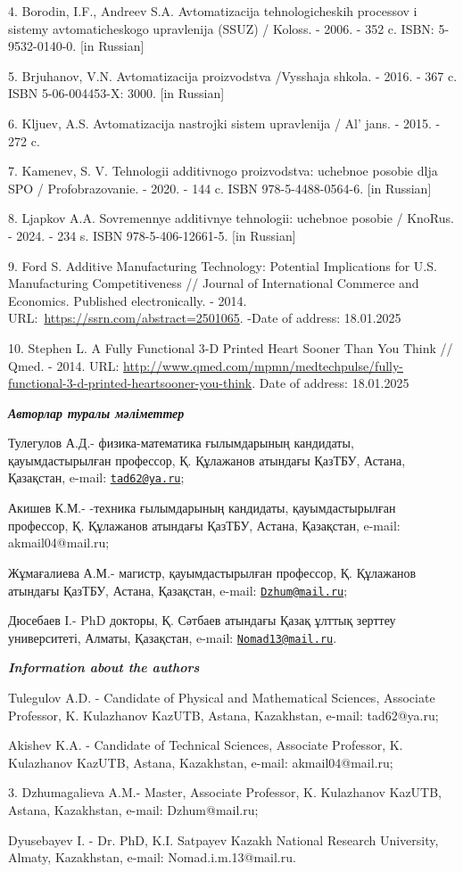 4. Borodin, I.F., Andreev S.A. Avtomatizacija tehnologicheskih processov
i sistemy avtomaticheskogo upravlenija (SSUZ) / Koloss. - 2006. - 352 c.
ISBN: 5-9532-0140-0. {[}in Russian{]}

5. Brjuhanov, V.N. Avtomatizacija proizvodstva /Vysshaja shkola. - 2016.
- 367 c. ISBN 5-06-004453-X: 3000. {[}in Russian{]}

6. Kljuev, A.S. Avtomatizacija nastrojki sistem upravlenija /
Al' jans. - 2015. - 272 c.

7. Kamenev, S. V. Tehnologii additivnogo proizvodstva: uchebnoe posobie
dlja SPO / Profobrazovanie. - 2020. - 144 c. ISBN 978-5-4488-0564-6.
{[}in Russian{]}

8. Ljapkov A.A. Sovremennye additivnye tehnologii: uchebnoe posobie /
KnoRus. - 2024. - 234 s. ISBN 978-5-406-12661-5. {[}in Russian{]}

9. Ford S. Additive Manufacturing Technology: Potential Implications for
U.S. Manufacturing Competitiveness // Journal of International Commerce
and Economics. Published electronically. - 2014.
URL:~\url{https://ssrn.com/abstract=2501065}. -Date of address:
18.01.2025

10. Stephen L. A Fully Functional 3-D Printed Heart Sooner Than You
Think // Qmed. - 2014. URL:
\url{http://www.qmed.com/mpmn/medtechpulse/fully-functional-3-d-printed-heartsooner-you-think}.
Date of address: 18.01.2025

\emph{{\bfseries Авторлар туралы мәліметтер}}

Тулегулов А.Д.- физика-математика ғылымдарының кандидаты,
қауымдастырылған профессор, Қ. Құлажанов атындағы ҚазТБУ, Астана,
Қазақстан, e-mail: \href{mailto:tad62@ya.ru}{\nolinkurl{tad62@ya.ru}};

Акишев К.М.- -техника ғылымдарының кандидаты, қауымдастырылған
профессор, Қ. Құлажанов атындағы ҚазТБУ, Астана, Қазақстан, e-mail:
akmail04@mail.ru;

Жұмағалиева А.М.- магистр, қауымдастырылған профессор, Қ. Құлажанов
атындағы ҚазТБУ, Астана, Қазақстан, e-mail:
\href{mailto:Dzhum@mail.ru}{\nolinkurl{Dzhum@mail.ru}};

Дюсебаев І.- PhD докторы, Қ. Сәтбаев атындағы Қазақ ұлттық зерттеу
университеті, Алматы, Қазақстан, e-mail:
\href{mailto:Nomad13@mail.ru}{\nolinkurl{Nomad13@mail.ru}}.

\emph{{\bfseries Information about the authors}}

Tulegulov A.D. - Candidate of Physical and Mathematical Sciences,
Associate Professor, K. Kulazhanov KazUTB, Astana, Kazakhstan, e-mail:
tad62@ya.ru;

Akishev K.A. - Candidate of Technical Sciences, Associate Professor, K.
Kulazhanov KazUTB, Astana, Kazakhstan, e-mail: akmail04@mail.ru;

3. Dzhumagalieva A.M.- Master, Associate Professor, K. Kulazhanov
KazUTB, Astana, Kazakhstan, e-mail: Dzhum@mail.ru;

Dyusebayev I. - Dr. PhD, K.I. Satpayev Kazakh National Research
University, Almaty, Kazakhstan, e-mail: Nomad.i.m.13@mail.ru.\